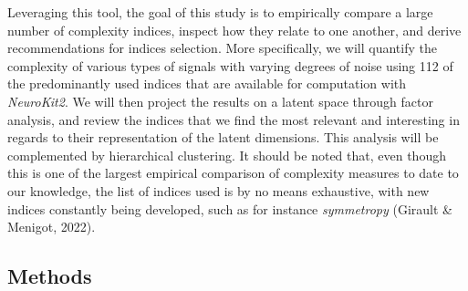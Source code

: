 \documentclass[
  man]{apa6}
\begin{document}
Leveraging this tool, the goal of this study is to empirically compare a large number of complexity indices, inspect how they relate to one another, and derive recommendations for indices selection. More specifically, we will quantify the complexity of various types of signals with varying degrees of noise using 112 of the predominantly used indices that are available for computation with \emph{NeuroKit2}. We will then project the results on a latent space through factor analysis, and review the indices that we find the most relevant and interesting in regards to their representation of the latent dimensions. This analysis will be complemented by hierarchical clustering. It should be noted that, even though this is one of the largest empirical comparison of complexity measures to date to our knowledge, the list of indices used is by no means exhaustive, with new indices constantly being developed, such as for instance \emph{symmetropy} (Girault \& Menigot, 2022).

\hypertarget{methods}{%
\subsection{Methods}\label{methods}}
\end{document}
